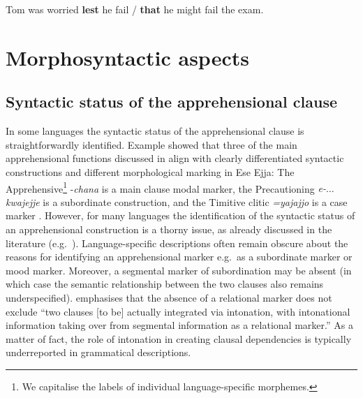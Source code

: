 \documentclass[output=paper,colorlinks,citecolor=brown
]{langscibook}
\begin{document}
\ea\label{ex:intro8} Tom was worried \textbf{lest} he fail / \textbf{that} he might fail the exam.
\z



\section{Morphosyntactic aspects}
\label{sec:morph}


\subsection{Syntactic status of the apprehensional clause}
\label{intro:syntacticstatus}

In some languages the syntactic status of the apprehensional clause is straightforwardly identified. Example  showed that three of the main apprehensional functions discussed in  align with clearly differentiated syntactic constructions and different morphological marking in Ese Ejja: The Apprehensive\footnote{We capitalise the labels of individual language-specific morphemes.}   \nobreakdash-\textit{chana} is a main clause modal marker, the Precautioning \textit{e-$\ldots$kwajejje} is a subordinate construction, and the Timitive clitic \textit{=yajajjo} is a case marker \citep{vuillermet2018a}. However, for many languages the identification of the syntactic status of an apprehensional construction is a thorny issue, as already discussed in the literature (e.g.\ \cite[230]{Austin2021}). Language-specific descriptions often remain obscure about the reasons for identifying an apprehensional marker e.g.\ as a subordinate marker or mood marker. Moreover, a segmental marker of subordination may be absent (in which case the semantic relationship between the two clauses also remains underspecified). \citet[219]{verstraete2006b} emphasises that the absence of a relational marker does not exclude ``two clauses [to be] actually integrated via intonation, with intonational information taking over from segmental information as a relational marker.'' As a matter of fact, the role of intonation in creating clausal dependencies is typically underreported in grammatical descriptions.
\end{document}
